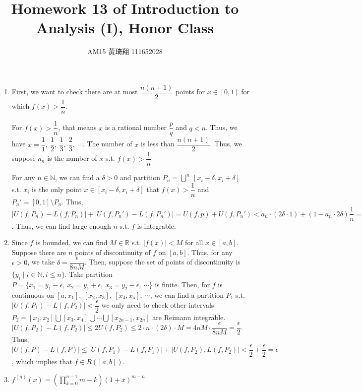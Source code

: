 \documentclass[12pt]{article}
\title{Homework 13 of Introduction to Analysis (I), Honor Class}
\author{AM15 黃琦翔 111652028}
\begin{document}
\maketitle
\begin{enumerate}
    \item First, we want to check there are at most $\dfrac{n(n+1)}{2}$ points for $x\in [0, 1]$ for which $f(x) > \dfrac{1}{n}$.
    
    For $f(x) > \dfrac{1}{n}$, that means $x$ is a rational number $\dfrac{p}{q}$ and $q < n$.
    Thus, we have $x = \dfrac{1}{1},\ \dfrac{1}{2},\ \dfrac{1}{3},\ \dfrac{2}{3},\ \cdots$.
    The number of $x$ is less than $\dfrac{n(n+1)}{2}$. Thus, we suppose $a_n$ is the number of $x$ s.t.  $f(x) > \dfrac{1}{n}$

    For any $n\in \mathbb{N}$, we can find a $\delta > 0$ and  partition $P_n = \displaystyle\bigcup^n\ [x_i - \delta, x_i + \delta]$ s.t. $x_i$ is the only point $x\in [x_i-\delta, x_i + \delta]$ that $f(x) > \dfrac{1}{n}$  and $P_n' = [0, 1]\setminus P_n$.
    Thus, $|U(f, P_n) - L(f, P_n)| + |U(f, P_n') - L(f, P_n')| = U(f, p) + U(f, P_n') < a_n\cdot(2\delta\cdot 1) + (1-a_n\cdot 2\delta)\dfrac{1}{n} = \dfrac{1}{n}$.
    Thus, we can find large enough $n$ s.t. $f$ is integrable.


    \item Since $f$ is bounded, we can find $M\in \mathbb{R}$ s.t. $|f(x)| < M$ for all $x\in [a, b]$.
    Suppose there are $n$ points of discontinuity of $f$ on $[a, b]$.
    Thus, for any $\epsilon > 0$, we take $\delta = \dfrac{\epsilon}{8nM}$.
    Then, suppose the set of points of discontinuity is $\lbrace y_i\mid i \in \mathbb{N}, i \leq n\rbrace$.
    Take partition $P = \lbrace x_1 = y_1 - \epsilon,\ x_2 = y_1 + \epsilon,\ x_3 = y_2-\epsilon,\ \cdots\rbrace$ is finite.
    Then, for $f$ is continuous on $[a, x_1],\ [x_2, x_3],\ [x_4, x_5],\ \cdots$, 
    we can find a partition $P_1$ s.t. $|U(f, P_1) - L(f, P_2)| < \dfrac{\epsilon}{2}$
    we only need to check other intervals $P_2 = [x_1, x_2]\bigcup [x_3, x_4]\bigcup \cdots \bigcup [x_{2n-1}, x_{2n}]$ are Reimann integrable.
    $|U(f, P_2) - L(f, P_2)| \leq 2U(f, P_2) \leq 2\cdot n \cdot  (2\delta) \cdot M = 4nM \cdot \dfrac{\epsilon}{8nM} = \dfrac{\epsilon}{2}$.
    Thus, $|U(f, P) - L(f, P)| \leq |U(f, P_1) - L(f, P_1)| + |U(f, P_2), L(f, P_2)| < \dfrac{\epsilon}{2} + \dfrac{\epsilon}{2} = \epsilon$, which implies that $f\in R([a, b])$.

    \item $f^{(n)}(x) = (\displaystyle\prod_{k=0}^{n-1} m-k) (1 + x)^{m-n}$
\end{enumerate}
\end{document}
